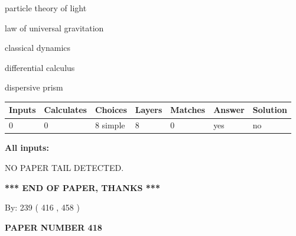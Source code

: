 \documentclass[12pt]{article}
\begin{document}
 
\noindent{}
 
 
particle theory of light
 
 
law of universal gravitation
 
 
classical dynamics
 
 
differential calculus
 
 
dispersive prism
 
 
\noindent{}
 
 
   
   
   
   
\noindent\begin{tabular}{|l|l|l|l|l|l|l|}
 \hline
Inputs & Calculates & Choices & Layers & Matches & Answer & Solution \\ \hline
 0  & 
 0  & 
 8
  simple  
  & 
 8  & 
 0  & 
  yes & 
  no 
  \\ \hline
 \end{tabular}
   
   
   
   
\noindent{}
   
   
   
   
\noindent\vspace{0.1in}\hspace{-0.08in} {\textbf{\Large{All inputs: }}}
   
   
   
   
\vspace{2.0in} NO PAPER TAIL DETECTED.
   
   
   
   
\vspace{1.0in} 
{\textbf{\large{ *** END OF PAPER, THANKS *** }}} 
   
   
\hspace{1.0in} By: 
 239 ( 416 ,  458 )
   
   
   
   
\newpage 
\setcounter{page}{ 
   418001 } 
   
   
   
   
 {\textbf{ \Large{ PAPER NUMBER  418  }}}
   
\end{document}

